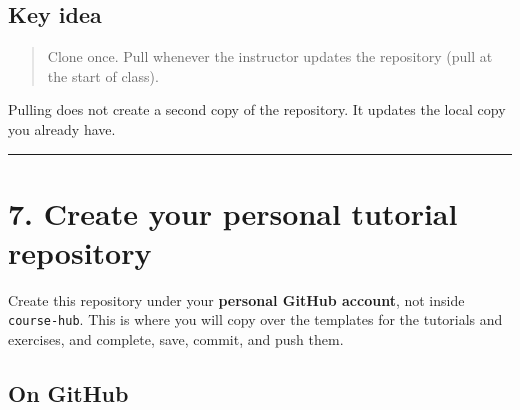 \documentclass[
  letterpaper,
  DIV=11,
  numbers=noendperiod]{scrartcl}
\begin{document}
\subsection{Key idea}\label{key-idea}

\begin{quote}
Clone once. Pull whenever the instructor updates the repository (pull at
the start of class).
\end{quote}

Pulling does not create a second copy of the repository. It updates the
local copy you already have.

\begin{center}\rule{0.5\linewidth}{0.5pt}\end{center}

\section{7. Create your personal tutorial
repository}\label{create-your-personal-tutorial-repository}

Create this repository under your \textbf{personal GitHub account}, not
inside \texttt{course-hub}. This is where you will copy over the
templates for the tutorials and exercises, and complete, save, commit,
and push them.

\subsection{On GitHub}\label{on-github-1}
\end{document}
